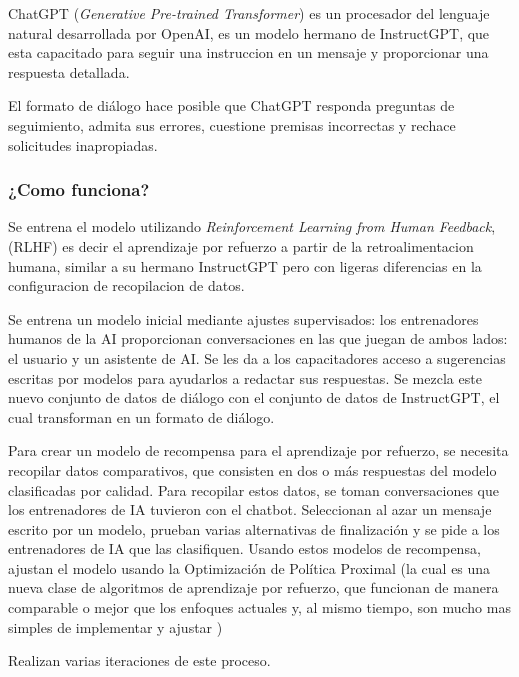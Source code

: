 \documentclass[runningheads]{llncs} %
\begin{document}
ChatGPT (\textit{Generative Pre-trained Transformer}) es un procesador del lenguaje natural
desarrollada por OpenAI, es un modelo hermano de InstructGPT, que esta capacitado
para seguir una instruccion en un mensaje y proporcionar una respuesta detallada.
\cite{ej-chatgpt}

El formato de diálogo hace posible que ChatGPT responda preguntas de seguimiento, 
admita sus errores, cuestione premisas incorrectas y rechace solicitudes inapropiadas.


\subsubsection{¿Como funciona?}
Se entrena el modelo utilizando \textit{Reinforcement Learning from Human Feedback}, 
(RLHF) es decir el aprendizaje por refuerzo a partir de la retroalimentacion humana,
similar a su hermano InstructGPT pero con ligeras diferencias en la configuracion de
recopilacion de datos. \cite{ej-chatgpt}

Se entrena un modelo inicial mediante ajustes supervisados: los entrenadores humanos
de la AI proporcionan conversaciones en las que juegan de ambos lados: el usuario
y un asistente de AI. Se les da a los capacitadores acceso a sugerencias escritas
por modelos para ayudarlos a redactar sus respuestas. 
Se mezcla este nuevo conjunto de datos de diálogo con el conjunto de datos de InstructGPT, 
el cual transforman en un formato de diálogo. \cite{ej-chatgpt}

Para crear un modelo de recompensa para el aprendizaje por refuerzo, 
se necesita recopilar datos comparativos, que consisten en dos o más respuestas 
del modelo clasificadas por calidad. Para recopilar estos datos, se toman conversaciones 
que los entrenadores de IA tuvieron con el chatbot. Seleccionan al azar un mensaje 
escrito por un modelo, prueban varias alternativas de finalización y se pide a los 
entrenadores de IA que las clasifiquen. Usando estos modelos de recompensa, 
ajustan el modelo usando la Optimización de Política Proximal (la cual es
una nueva clase de algoritmos de aprendizaje por refuerzo, que funcionan de manera
comparable o mejor que los enfoques actuales y, al mismo tiempo, son mucho mas
simples de implementar y ajustar \cite{def-PPO})

Realizan varias iteraciones de este proceso. \cite{ej-chatgpt}
\end{document}
